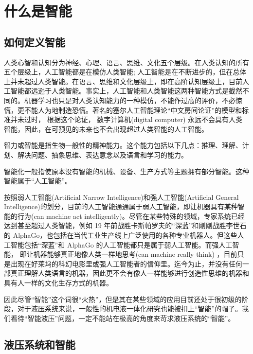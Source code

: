 \chapter{什么是智能}
\label{chap:definition}

\section{如何定义智能}

人类心智和认知分为神经、心理、语言、思维、文化五个层级。在人类认知的所有五个层级上，人工智能都是在模仿人类智能; 人工智能是在不断进步的，但在总体上并未超过人类智能。在语言、思维和文化层级上，即在高阶认知层级上，目前人工智能都远逊于人类智能。事实上，人工智能和人类智能这两种智能方式是截然不同的。机器学习也只是对人类认知能力的一种模仿，不能作过高的评价，不必惊慌，更不能人为地制造恐慌。著名的塞尔人工智能理论“中文房间论证”的模型和标准并未过时， 根据这个论证， 数字计算机(digital computer) 永远不会具有人类智能，因此，在可预见的未来也不会出现超过人类智能的人工智能\cite{renjidazhan}。

智力或智能是指生物一般性的精神能力。这个能力包括以下几点：推理、理解、计划、解决问题、抽象思维、表达意念以及语言和学习的能力。
	
智能化一般指使原本没有智能的机械、设备、生产方式等主题拥有部分智能。这种智能属于“人工智能”。

按照弱人工智能(Artificial Narrow Intelligence)和强人工智能(Artificial General Intelligence)的划分，目前的人工智能通通属于弱人工智能，即让机器具有某种智能的行为(can machine act intelligently)。尽管在某些特殊的领域，专家系统已经达到甚至超过人类智能，例如 19 年前战胜卡斯帕罗夫的“深蓝”和刚刚战胜李世石的 AlphaGo，也包括在当代工业生产线上广泛使用的各种专业机器人。但这些人工智能包括“深蓝”和 AlphaGo 的人工智能都只是属于弱人工智能。而强人工智能， 即让机器能够真正地像人类一样地思考(can machine really think) ，目前只是出现在好莱坞的科幻电影里或强人工智能者的信仰里。迄今为止，并没有任何一部真正理解人类语言的机器，因此更不会有像人一样能够进行创造性思维的机器和具有人一样的文化生存方式的机器\cite{renjidazhan}。

因此尽管“智能”这个词很“火热”，但是其在某些领域的应用目前还处于很初级的阶段，对于液压系统来说，一般性的机电液一体化研究也能被扣上“智能”的帽子。我们看待“智能液压”问题，一定不能站在极高的角度来苛求液压系统的“智能”。

\section{液压系统和智能}

